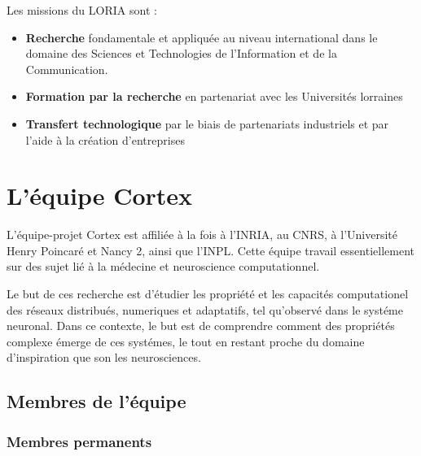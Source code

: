Les missions du LORIA sont :
\begin{itemize}
   \item \textbf{Recherche} fondamentale et appliquée au niveau international dans le domaine des Sciences et
      Technologies de l'Information et de la Communication.
   \item \textbf{Formation par la recherche} en partenariat avec les Universités lorraines
   \item \textbf{Transfert technologique} par le biais de partenariats industriels et par l'aide à la création
      d'entreprises
\end{itemize}


\section{L'équipe Cortex} %
\label{sec:Cortex}

L'équipe-projet Cortex est affiliée à la fois à l'INRIA, au CNRS, à l'Université Henry Poincaré et Nancy 2,
ainsi que l'INPL. Cette équipe travail essentiellement sur des sujet lié à la médecine et neuroscience
computationnel.

Le but de ces recherche est d'étudier les propriété et les capacités computationel des réseaux distribués,
numeriques et adaptatifs, tel qu'observé dans le systéme neuronal. Dans ce contexte, le but est de
comprendre comment des propriétés complexe émerge de ces systémes, le tout en restant proche du domaine
d'inspiration que son les neurosciences. 

\subsection{Membres de l'équipe} %
\label{sub:Membres de l'équipe}

\subsubsection{Membres permanents} %
\label{ssub:Membres permanents}

